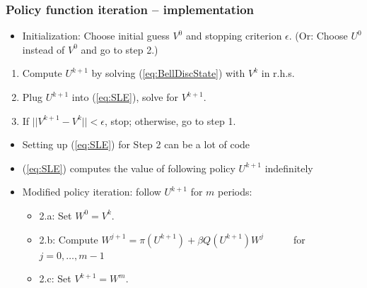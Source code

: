 \documentclass[bigger,handout]{beamer}
\begin{document}
\begin{frame}%

\frametitle{Policy function iteration -- implementation}

\begin{itemize}
\item Initialization: Choose initial guess $V^{0}$ and stopping criterion $%
\epsilon $. \newline
(Or: Choose $U^{0}$ instead of $V^{0}$ and go to step 2.)
\end{itemize}

\begin{enumerate}
\item Compute $U^{k+1}$ by solving (\ref{eq:BellDiscState}) with $V^{k}$ in
r.h.s.

\item Plug $U^{k+1}$ into (\ref{eq:SLE}), solve for $V^{k+1}$.

\item If $||V^{k+1}-V^{k}||<\epsilon $, stop; otherwise, go to step 1.
\end{enumerate}

\begin{itemize}
\item Setting up (\ref{eq:SLE}) for Step 2 can be a lot of code

\item (\ref{eq:SLE}) computes the value of following policy $U^{k+1}$
indefinitely

\item Modified policy iteration: follow $U^{k+1}$ for $m$ periods:

\begin{itemize}
\item 2.a: Set $W^{0}=V^{k}$.

\item 2.b: Compute $W^{j+1}=\pi \left( U^{k+1}\right) +\beta Q\left(
U^{k+1}\right) W^{j}$ \newline
$\left. \text{ }\right. \left. \text{ }\right. \left. \text{ }\right. \left.
\text{ }\right. $for $j=0,\ldots ,m-1$

\item 2.c: Set $V^{k+1}=W^{m}$.
\end{itemize}
\end{itemize}



\end{frame}%
\end{document}
